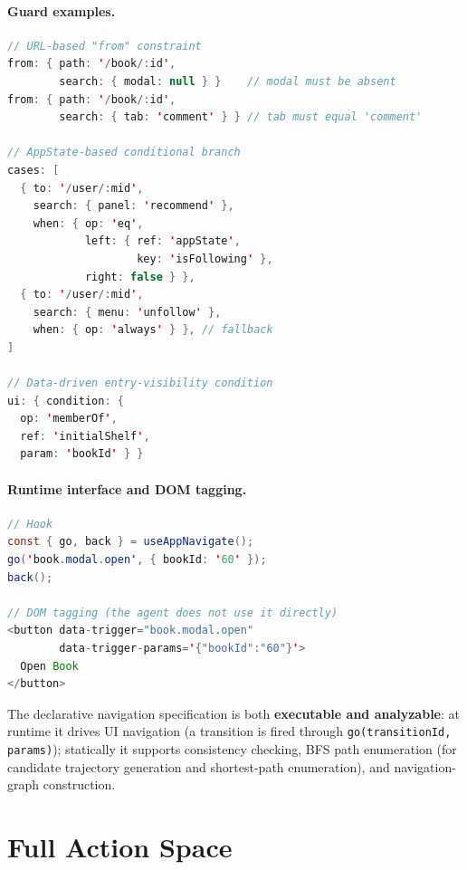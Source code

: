 \paragraph{Guard examples.}\mbox{}\par\medskip
\begin{lstlisting}[language=Java]
// URL-based "from" constraint
from: { path: '/book/:id',
        search: { modal: null } }    // modal must be absent
from: { path: '/book/:id',
        search: { tab: 'comment' } } // tab must equal 'comment'

// AppState-based conditional branch
cases: [
  { to: '/user/:mid',
    search: { panel: 'recommend' },
    when: { op: 'eq',
            left: { ref: 'appState',
                    key: 'isFollowing' },
            right: false } },
  { to: '/user/:mid',
    search: { menu: 'unfollow' },
    when: { op: 'always' } }, // fallback
]

// Data-driven entry-visibility condition
ui: { condition: {
  op: 'memberOf',
  ref: 'initialShelf',
  param: 'bookId' } }
\end{lstlisting}

\paragraph{Runtime interface and DOM tagging.}\mbox{}\par\medskip
\begin{lstlisting}[language=Java]
// Hook
const { go, back } = useAppNavigate();
go('book.modal.open', { bookId: '60' });
back();

// DOM tagging (the agent does not use it directly)
<button data-trigger="book.modal.open"
        data-trigger-params='{"bookId":"60"}'>
  Open Book
</button>
\end{lstlisting}

The declarative navigation specification is both \textbf{executable and analyzable}: at runtime it drives UI navigation (a transition is fired through \texttt{go(transitionId, params)}); statically it supports consistency checking, BFS path enumeration (for candidate trajectory generation and shortest-path enumeration), and navigation-graph construction.


\section{Full Action Space}\label{app:action-space}

